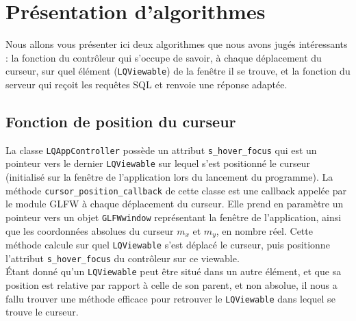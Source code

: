 \documentclass[twoside]{report}
\begin{document}
\chapter{Présentation d'algorithmes}

Nous allons vous présenter ici deux algorithmes que nous avons jugés intéressants : la fonction du contrôleur qui s'occupe de savoir, à chaque déplacement du curseur, sur quel élément (\verb!LQViewable!) de la fenêtre il se trouve, et la fonction du serveur qui reçoit les requêtes SQL et renvoie une réponse adaptée.
\section{Fonction de position du curseur}
La classe \verb!LQAppController! possède un attribut \verb!s_hover_focus! qui est un pointeur vers le dernier \verb!LQViewable! sur lequel s'est positionné le curseur (initialisé sur la fenêtre de l'application lors du lancement du programme).
La méthode \verb!cursor_position_callback! de cette classe est une callback appelée par le module GLFW à chaque déplacement du curseur. Elle prend en paramètre un pointeur vers un objet \verb!GLFWwindow! représentant la fenêtre de l'application, ainsi que les coordonnées absolues du curseur $m_x$ et $m_y$, en nombre réel. Cette méthode calcule sur quel \verb!LQViewable! s'est déplacé le curseur, puis positionne l'attribut \verb!s_hover_focus! du contrôleur sur ce viewable. \\
Étant donné qu'un \verb!LQViewable! peut être situé dans un autre élément, et que sa position est relative par rapport à celle de son parent, et non absolue, il nous a fallu trouver une méthode efficace pour retrouver le \verb!LQViewable! dans lequel se trouve le curseur. \\
\end{document}
